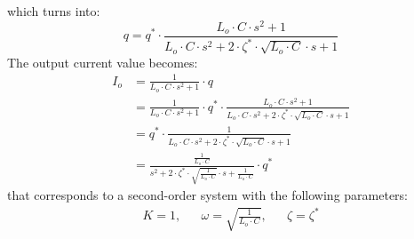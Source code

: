 which turns into:
\begin{equation}
    q = q^* \cdot \frac{L_o \cdot C \cdot s^2 + 1}{L_o \cdot C \cdot s^2 + 2 \cdot \zeta^* \cdot \sqrt{L_o \cdot C} \cdot s + 1}
\end{equation}
The output current value becomes:
\begin{equation}
    \label{eq:outputcurrent}
    \begin{split}
        I_o &= \frac{1}{L_o \cdot C \cdot s^2 + 1} \cdot q \\
        &= \frac{1}{L_o \cdot C \cdot s^2 + 1} \cdot q^* \cdot \frac{L_o \cdot C \cdot s^2 + 1}{L_o \cdot C \cdot s^2 + 2 \cdot \zeta^* \cdot \sqrt{L_o \cdot C} \cdot s + 1} \\
        &= q^* \cdot \frac{1}{L_o \cdot C \cdot s^2 + 2 \cdot \zeta^* \cdot \sqrt{L_o \cdot C} \cdot s + 1} \\
        &= \frac{\frac{1}{L_o \cdot C}}{s^2 + 2 \cdot \zeta^* \cdot \sqrt{\frac{1}{L_o \cdot C}} \cdot s + \frac{1}{L_o \cdot C}} \cdot q^*
    \end{split}
\end{equation}
that corresponds to a second-order system with the following parameters:
\begin{align*}
    K = 1,      &&  \omega = \sqrt{\frac{1}{L_o \cdot C}},      &&  \zeta = \zeta^*
\end{align*}

